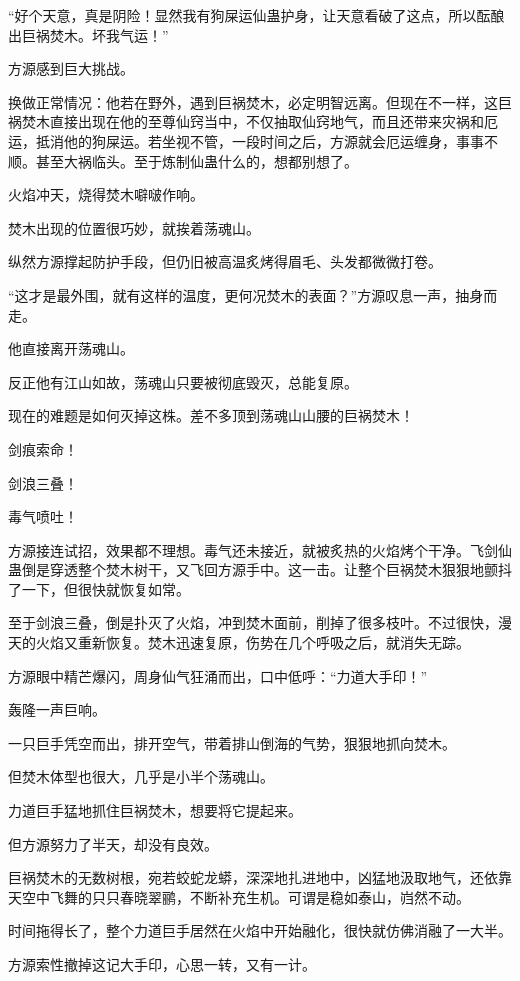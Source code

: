 \begin{this_body}
“好个天意，真是阴险！显然我有狗屎运仙蛊护身，让天意看破了这点，所以酝酿出巨祸焚木。坏我气运！”

方源感到巨大挑战。

换做正常情况：他若在野外，遇到巨祸焚木，必定明智远离。但现在不一样，这巨祸焚木直接出现在他的至尊仙窍当中，不仅抽取仙窍地气，而且还带来灾祸和厄运，抵消他的狗屎运。若坐视不管，一段时间之后，方源就会厄运缠身，事事不顺。甚至大祸临头。至于炼制仙蛊什么的，想都别想了。

火焰冲天，烧得焚木噼啵作响。

焚木出现的位置很巧妙，就挨着荡魂山。

纵然方源撑起防护手段，但仍旧被高温炙烤得眉毛、头发都微微打卷。

“这才是最外围，就有这样的温度，更何况焚木的表面？”方源叹息一声，抽身而走。

他直接离开荡魂山。

反正他有江山如故，荡魂山只要被彻底毁灭，总能复原。

现在的难题是如何灭掉这株。差不多顶到荡魂山山腰的巨祸焚木！

剑痕索命！

剑浪三叠！

毒气喷吐！

方源接连试招，效果都不理想。毒气还未接近，就被炙热的火焰烤个干净。飞剑仙蛊倒是穿透整个焚木树干，又飞回方源手中。这一击。让整个巨祸焚木狠狠地颤抖了一下，但很快就恢复如常。

至于剑浪三叠，倒是扑灭了火焰，冲到焚木面前，削掉了很多枝叶。不过很快，漫天的火焰又重新恢复。焚木迅速复原，伤势在几个呼吸之后，就消失无踪。

方源眼中精芒爆闪，周身仙气狂涌而出，口中低呼：“力道大手印！”

轰隆一声巨响。

一只巨手凭空而出，排开空气，带着排山倒海的气势，狠狠地抓向焚木。

但焚木体型也很大，几乎是小半个荡魂山。

力道巨手猛地抓住巨祸焚木，想要将它提起来。

但方源努力了半天，却没有良效。

巨祸焚木的无数树根，宛若蛟蛇龙蟒，深深地扎进地中，凶猛地汲取地气，还依靠天空中飞舞的只只春晓翠鹂，不断补充生机。可谓是稳如泰山，岿然不动。

时间拖得长了，整个力道巨手居然在火焰中开始融化，很快就仿佛消融了一大半。

方源索性撤掉这记大手印，心思一转，又有一计。


\end{this_body}
